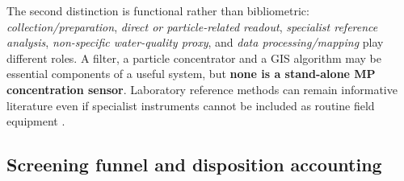 \documentclass[10pt,a4paper]{article}
\begin{document}
The second distinction is functional rather than bibliometric: \emph{collection/preparation}, \emph{direct or particle-related readout}, \emph{specialist reference analysis}, \emph{non-specific water-quality proxy}, and \emph{data processing/mapping} play different roles. A filter, a particle concentrator and a GIS algorithm may be essential components of a useful system, but \textbf{none is a stand-alone MP concentration sensor}. Laboratory reference methods can remain informative literature even if specialist instruments cannot be included as routine field equipment \cite{Blevins2021,Ermolin2024,Sefiloglu2024}.

\subsection{Screening funnel and disposition accounting}
\end{document}
